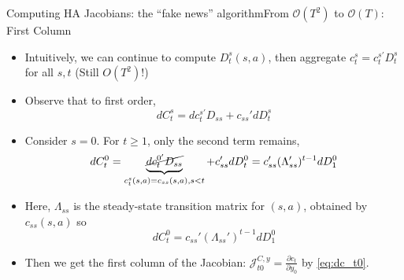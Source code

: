 \documentclass[aspectratio=169]{beamer}
\begin{document}
\begin{frame}{Computing HA Jacobians: the ``fake news'' algorithm}{From $\mathcal{O}(T^2)$ to $\mathcal{O}(T)$: First Column}
    \begin{itemize}
        \item Intuitively, we can continue to compute $D_t^s(s,a)$, then aggregate $c_t^s = c_t^{s'} D_t^s$ for all $s,t$ (Still $O(T^2)!$)
        \item Observe that to first order,
        \[
        dC_t^s = dc_t^{s'} D_{ss} + c_{ss}' dD_t^s
        \]
        \item Consider $s=0$. For $t \geq 1$, only the second term remains,
        \[
        dC_t^0 = \underbrace{\cancel{dc_t^{0'} D_{ss}}}_{c_t^s(s,a)=c_{ss}(s,a),s<t} + c_{ss}' dD_t^0 = c_{ss}' (\Lambda_{ss}')^{t-1} dD_1^0
        \]
        \item Here, $\Lambda_{ss}$ is the steady-state transition matrix for $(s,a)$,\alert{ obtained by $c_{ss}(s,a)$ } so
        \begin{equation}
            dC_t^0 = c_{ss}' (\Lambda_{ss}')^{t-1} dD_1^0 \label{eq:dc_t0}
        \end{equation}
        \item Then we get the \alert{first column} of the Jacobian: $\mathcal{J}_{t0}^{C,y} = \frac{\partial c_t}{\partial y_0}$ by \eqref{eq:dc_t0}.
    \end{itemize}
\end{frame}
\end{document}
